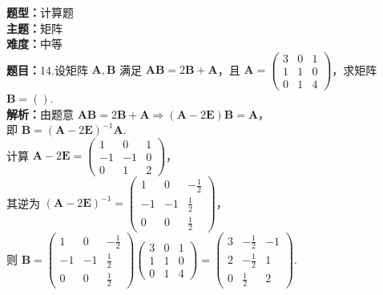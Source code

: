 \documentclass{ctexart}
\newenvironment{question}[5]{%
	\noindent\textbf{题型：}#1\\
	\textbf{主题：}#2\\
	\textbf{难度：}#3\\
	\textbf{题目：}#4\\
	\textbf{解析：}#5\\
	\vspace{1em}
}{}
\begin{document}
	\begin{question}
		{计算题}
		{矩阵}
		{中等}
		{14.设矩阵 \(\mathbf{A}, \mathbf{B}\) 满足 \(\mathbf{A} \mathbf{B} = 2\mathbf{B} + \mathbf{A}\)，且 \(\mathbf{A} = \left(\begin{array}{ccc}3 & 0 & 1 \\ 1 & 1 & 0 \\ 0 & 1 & 4\end{array}\right)\)，求矩阵 \(\mathbf{B} = ()\). }
		{由题意 \(\mathbf{A} \mathbf{B} = 2\mathbf{B} + \mathbf{A} \Rightarrow (\mathbf{A} - 2\mathbf{E}) \mathbf{B} = \mathbf{A}\)，\\
			即 \(\mathbf{B} = (\mathbf{A} - 2\mathbf{E})^{-1} \mathbf{A}\). \\
			计算 \(\mathbf{A} - 2\mathbf{E} = \left(\begin{array}{ccc}1 & 0 & 1 \\ -1 & -1 & 0 \\ 0 & 1 & 2\end{array}\right)\)，\\
			其逆为 \((\mathbf{A} - 2\mathbf{E})^{-1} = \left(\begin{array}{ccc}1 & 0 & -\frac{1}{2} \\ -1 & -1 & \frac{1}{2} \\ 0 & 0 & \frac{1}{2}\end{array}\right)\)，\\
			则 \(\mathbf{B} = \left(\begin{array}{ccc}1 & 0 & -\frac{1}{2} \\ -1 & -1 & \frac{1}{2} \\ 0 & 0 & \frac{1}{2}\end{array}\right) \left(\begin{array}{ccc}3 & 0 & 1 \\ 1 & 1 & 0 \\ 0 & 1 & 4\end{array}\right) = \left(\begin{array}{ccc}3 & -\frac{1}{2} & -1 \\ 2 & -\frac{1}{2} & 1 \\ 0 & \frac{1}{2} & 2\end{array}\right)\). }
	\end{question}
	
\end{document}

